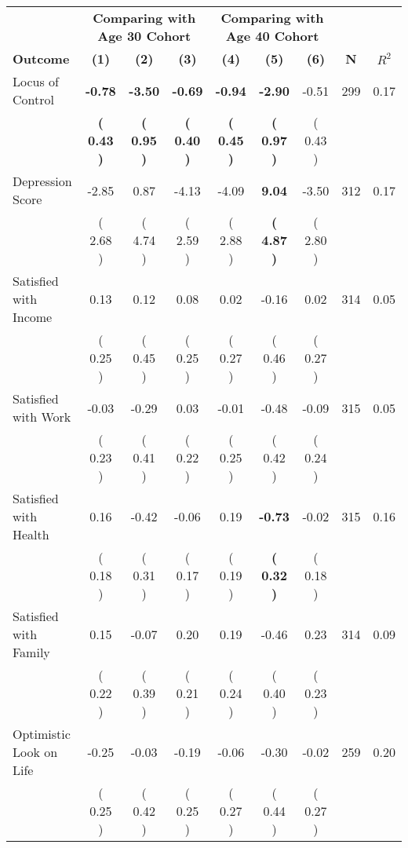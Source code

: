 \begin{tabular}{lcccccccc}
\toprule
 & \multicolumn{3}{c}{\textbf{Comparing with Age 30 Cohort}} & \multicolumn{3}{c}{\textbf{Comparing with Age 40 Cohort}} & \\
\cmidrule(lr){2-4} \cmidrule(lr){5-7} 
 \textbf{Outcome} & \textbf{(1)} & \textbf{(2)} & \textbf{(3)} & \textbf{(4)} & \textbf{(5)} & \textbf{(6)} & \textbf{N} & \textbf{$ R^2$} \\
\midrule
Locus of Control & \textbf{    -0.78} & \textbf{    -3.50} & \textbf{    -0.69} & \textbf{    -0.94} & \textbf{    -2.90} &     -0.51 & 299 &       0.17 \\ 
 & \textbf{(     0.43 )} & \textbf{(     0.95 )} & \textbf{(     0.40 )} & \textbf{(     0.45 )} & \textbf{(     0.97 )} & (     0.43 ) & \\
Depression Score &     -2.85 &      0.87 &     -4.13 &     -4.09 & \textbf{     9.04} &     -3.50 & 312 &       0.17 \\ 
 & (     2.68 ) & (     4.74 ) & (     2.59 ) & (     2.88 ) & \textbf{(     4.87 )} & (     2.80 ) & \\
Satisfied with Income &      0.13 &      0.12 &      0.08 &      0.02 &     -0.16 &      0.02 & 314 &       0.05 \\ 
 & (     0.25 ) & (     0.45 ) & (     0.25 ) & (     0.27 ) & (     0.46 ) & (     0.27 ) & \\
Satisfied with Work &     -0.03 &     -0.29 &      0.03 &     -0.01 &     -0.48 &     -0.09 & 315 &       0.05 \\ 
 & (     0.23 ) & (     0.41 ) & (     0.22 ) & (     0.25 ) & (     0.42 ) & (     0.24 ) & \\
Satisfied with Health &      0.16 &     -0.42 &     -0.06 &      0.19 & \textbf{    -0.73} &     -0.02 & 315 &       0.16 \\ 
 & (     0.18 ) & (     0.31 ) & (     0.17 ) & (     0.19 ) & \textbf{(     0.32 )} & (     0.18 ) & \\
Satisfied with Family &      0.15 &     -0.07 &      0.20 &      0.19 &     -0.46 &      0.23 & 314 &       0.09 \\ 
 & (     0.22 ) & (     0.39 ) & (     0.21 ) & (     0.24 ) & (     0.40 ) & (     0.23 ) & \\
Optimistic Look on Life &     -0.25 &     -0.03 &     -0.19 &     -0.06 &     -0.30 &     -0.02 & 259 &       0.20 \\ 
 & (     0.25 ) & (     0.42 ) & (     0.25 ) & (     0.27 ) & (     0.44 ) & (     0.27 ) & \\

\end{tabular}
